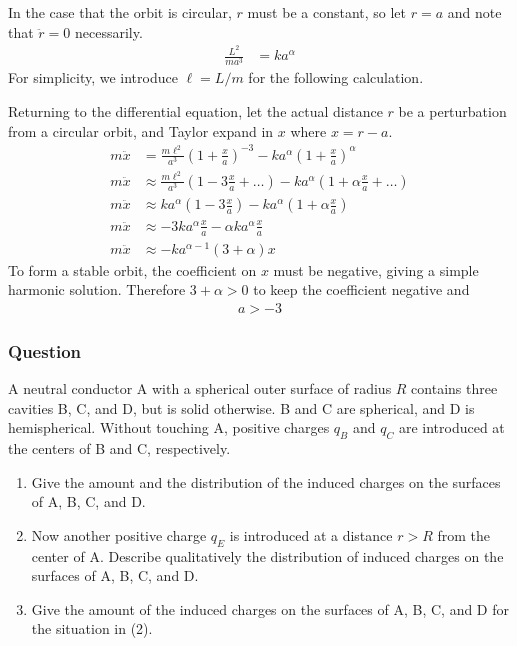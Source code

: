 In the case that the orbit is circular, $r$ must be a constant, so let $r = a$
and note that $\ddot r = 0$ necessarily.
\begin{align*}
	\frac{L^2}{ma^3 } &= ka^{\alpha}
\end{align*}
For simplicity, we introduce $\ell = L/m$ for the following calculation.

Returning to the differential equation, let the actual distance $r$ be a
perturbation from a circular orbit, and Taylor expand in $x$ where $x = r - a$.
\begin{align*}
	m\ddot x &= \frac{m\ell ^2}{a^3 } (1 + \frac{x}{a} )^{-3} -
		ka^{\alpha} \left(1 + \frac{x}{a} \right)^{\alpha} \\
	m\ddot x &\approx \frac{m\ell ^2}{a^3 } (1 - 3\frac{x}{a} + \ldots ) -
		ka^{\alpha} (1 + {\alpha}\frac{x}{a} + \ldots ) \\
	m\ddot x &\approx ka^{\alpha} (1 - 3\frac{x}{a} ) -
		ka^{\alpha} (1 + {\alpha}\frac{x}{a} ) \\
	m\ddot x &\approx -3ka^{\alpha} \frac{x}{a} - {\alpha}ka^{\alpha}\frac{x}{a} \\
	m\ddot x &\approx -ka^{{\alpha}-1} (3+{\alpha})x 
\end{align*}
To form a stable orbit, the coefficient on $x$ must be negative, giving a simple
harmonic solution. Therefore $3+{\alpha} > 0$ to keep the coefficient negative and
\begin{align}
	\boxed{
	a > -3
	}
\end{align}

\subsubsection{Question}

A neutral conductor A with a spherical outer surface of radius $R$ contains
three cavities B, C, and D, but is solid otherwise. B and C are spherical, and
D is hemispherical. Without touching A, positive charges $q_B$ and $q_C$ are
introduced at the centers of B and C, respectively.
\begin{enumerate}
	\item
		Give the amount and the distribution of the induced charges on the
		surfaces of A, B, C, and D.
	\item
		Now another positive charge $q_E$ is introduced at a distance $r > R$
		from the center of A. Describe qualitatively the distribution of
		induced charges on the surfaces of A, B, C, and D.
	\item
		Give the amount of the induced charges on the surfaces of A, B, C, and
		D for the situation in (2).
\end{enumerate}

